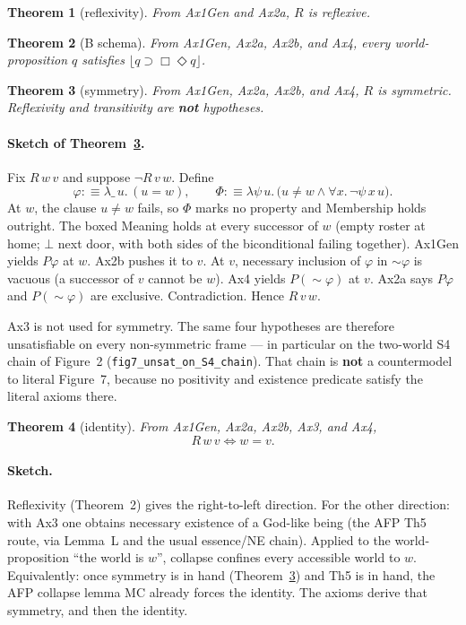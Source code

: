 \documentclass[11pt]{article}
\newtheorem{theorem}{Theorem}
\newcommand{\floor}[1]{\lfloor #1 \rfloor}
\begin{document}
\begin{theorem}[reflexivity]
From Ax1Gen and Ax2a, \(R\) is reflexive.
\end{theorem}

\begin{theorem}[B schema]
From Ax1Gen, Ax2a, Ax2b, and Ax4, every world-proposition \(q\) satisfies
\(\floor{q \supset \Box\Diamond q}\).
\end{theorem}

\begin{theorem}[symmetry]
\label{thm:symmetry}
From Ax1Gen, Ax2a, Ax2b, and Ax4, \(R\) is symmetric. Reflexivity and transitivity are
\textbf{not} hypotheses.
\end{theorem}

\paragraph{Sketch of Theorem~\ref{thm:symmetry}.}
Fix \(R\,w\,v\) and suppose \(\neg R\,v\,w\). Define
\[
\varphi :\equiv \lambda \_\, u.\, (u = w),
\qquad
\Phi :\equiv \lambda\psi\, u.\, \bigl(u \neq w \land \forall x.\, \neg\psi\,x\,u\bigr).
\]
At \(w\), the clause \(u \neq w\) fails, so \(\Phi\) marks no property and Membership holds
outright. The boxed Meaning holds at every successor of \(w\) (empty roster at home;
\(\bot\) next door, with both sides of the biconditional failing together). Ax1Gen yields
\(P\varphi\) at \(w\). Ax2b pushes it to \(v\). At \(v\), necessary inclusion of \(\varphi\)
in \(\sim\varphi\) is vacuous (a successor of \(v\) cannot be \(w\)). Ax4 yields
\(P(\sim\varphi)\) at \(v\). Ax2a says \(P\varphi\) and \(P(\sim\varphi)\) are exclusive.
Contradiction. Hence \(R\,v\,w\).

Ax3 is not used for symmetry. The same four hypotheses are therefore unsatisfiable on every
non-symmetric frame --- in particular on the two-world S4 chain of Figure~2
(\texttt{fig7\_unsat\_on\_S4\_chain}). That chain is \textbf{not} a countermodel to literal
Figure~7, because no positivity and existence predicate satisfy the literal axioms there.

\begin{theorem}[identity]
\label{thm:identity}
From Ax1Gen, Ax2a, Ax2b, Ax3, and Ax4,
\[
R\,w\,v \iff w = v.
\]
\end{theorem}

\paragraph{Sketch.}
Reflexivity (Theorem~2) gives the right-to-left direction. For the other direction: with
Ax3 one obtains necessary existence of a God-like being (the AFP Th5 route, via Lemma~L and
the usual essence/NE chain). Applied to the world-proposition ``the world is \(w\)'',
collapse confines every accessible world to \(w\). Equivalently: once symmetry is in hand
(Theorem~\ref{thm:symmetry}) and Th5 is in hand, the AFP collapse lemma MC already forces
the identity. The axioms derive that symmetry, and then the identity.
\end{document}
